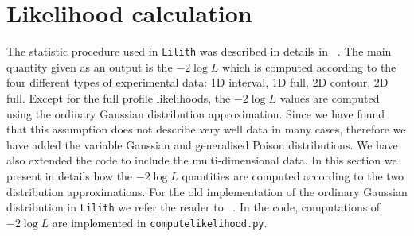 \clearpage
\section{Likelihood calculation} \label{sec:likelihood}
\newcommand{\lilith}{{\tt Lilith} }
\newcommand{\logL}{{ -2\log L } }
\newcommand{\XML}{ {\tt XML}}
\newcommand{\beq}{\begin{eqnarray}} 
\newcommand{\eeq}{\end{eqnarray}} 

\newcommand{\be}{\begin{equation}} 
\newcommand{\ee}{\end{equation}} 

\newcommand{\bpmatrix}{\begin{pmatrix}}
\newcommand{\epmatrix}{\end{pmatrix}}
\newcommand{\ba}{\begin{array}}
\newcommand{\ea}{\end{array}}
\newcommand{\braket}[1]{\left(#1\right)}
\newcommand{\sbraket}[1]{\left[#1\right]}
\newcommand{\bmu}{\bm{\mu}}
\newcommand{\hbmu}{\hat{\bm{\mu}}}
\newcommand{\diag}{\text{diag}}
\newcommand{\nhung}{\color{blue}}

The statistic procedure used in \lilith was described in details in ~\cite{Bernon:2015hsa}. 
The main quantity given as an output 
is the  $\logL$ which is computed according to the four different types of experimental data: 1D interval, 1D full,
2D contour, 2D full. Except for the full profile likelihoods, the $\logL$ values are computed using the ordinary Gaussian
distribution approximation. Since we have found that this assumption does not describe very well data in many cases, therefore
 we have added the  variable Gaussian and generalised Poison distributions. We have also extended the code to include the multi-dimensional data. In this section we present in details
how the  $\logL$ quantities are computed according to the two distribution approximations. For the old implementation of the  ordinary Gaussian distribution in \lilith
we refer the reader to ~\cite{Bernon:2015hsa}.
In the code, computations of $\logL$  are implemented in {\tt computelikelihood.py}.

